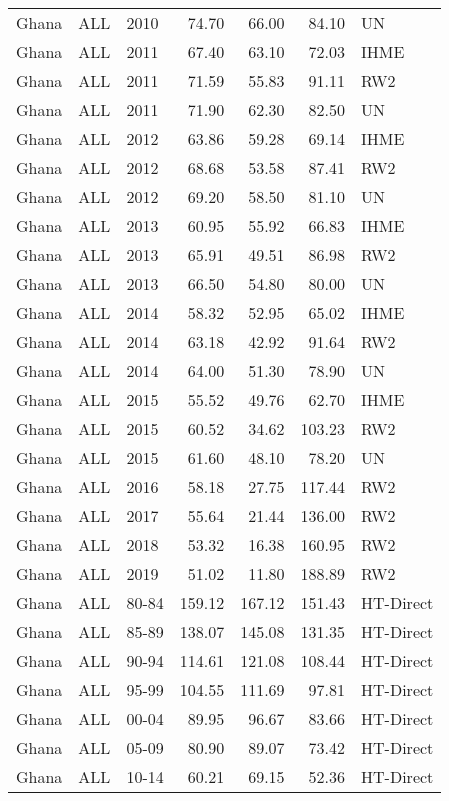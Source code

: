 \begin{longtable}{lllrrrl}
  Ghana & ALL & 2010 & 74.70 & 66.00 & 84.10 & UN \\ 
  Ghana & ALL & 2011 & 67.40 & 63.10 & 72.03 & IHME \\ 
  Ghana & ALL & 2011 & 71.59 & 55.83 & 91.11 & RW2 \\ 
  Ghana & ALL & 2011 & 71.90 & 62.30 & 82.50 & UN \\ 
  Ghana & ALL & 2012 & 63.86 & 59.28 & 69.14 & IHME \\ 
  Ghana & ALL & 2012 & 68.68 & 53.58 & 87.41 & RW2 \\ 
  Ghana & ALL & 2012 & 69.20 & 58.50 & 81.10 & UN \\ 
  Ghana & ALL & 2013 & 60.95 & 55.92 & 66.83 & IHME \\ 
  Ghana & ALL & 2013 & 65.91 & 49.51 & 86.98 & RW2 \\ 
  Ghana & ALL & 2013 & 66.50 & 54.80 & 80.00 & UN \\ 
  Ghana & ALL & 2014 & 58.32 & 52.95 & 65.02 & IHME \\ 
  Ghana & ALL & 2014 & 63.18 & 42.92 & 91.64 & RW2 \\ 
  Ghana & ALL & 2014 & 64.00 & 51.30 & 78.90 & UN \\ 
  Ghana & ALL & 2015 & 55.52 & 49.76 & 62.70 & IHME \\ 
  Ghana & ALL & 2015 & 60.52 & 34.62 & 103.23 & RW2 \\ 
  Ghana & ALL & 2015 & 61.60 & 48.10 & 78.20 & UN \\ 
  Ghana & ALL & 2016 & 58.18 & 27.75 & 117.44 & RW2 \\ 
  Ghana & ALL & 2017 & 55.64 & 21.44 & 136.00 & RW2 \\ 
  Ghana & ALL & 2018 & 53.32 & 16.38 & 160.95 & RW2 \\ 
  Ghana & ALL & 2019 & 51.02 & 11.80 & 188.89 & RW2 \\ 
  Ghana & ALL & 80-84 & 159.12 & 167.12 & 151.43 & HT-Direct \\ 
  Ghana & ALL & 85-89 & 138.07 & 145.08 & 131.35 & HT-Direct \\ 
  Ghana & ALL & 90-94 & 114.61 & 121.08 & 108.44 & HT-Direct \\ 
  Ghana & ALL & 95-99 & 104.55 & 111.69 & 97.81 & HT-Direct \\ 
  Ghana & ALL & 00-04 & 89.95 & 96.67 & 83.66 & HT-Direct \\ 
  Ghana & ALL & 05-09 & 80.90 & 89.07 & 73.42 & HT-Direct \\ 
  Ghana & ALL & 10-14 & 60.21 & 69.15 & 52.36 & HT-Direct \\ 

\end{longtable}
